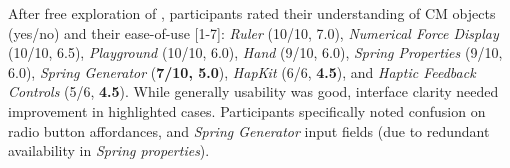 After free exploration of \SpringSim, participants rated their understanding of CM objects (yes/no) and their ease-of-use [1-7]:
\emph{Ruler} (10/10, 7.0),
\emph{Numerical Force Display} (10/10, 6.5),
\emph{Playground} (10/10, 6.0), 
\emph{Hand} (9/10, 6.0),
\emph{Spring Properties} (9/10, 6.0), 
\emph{Spring Generator} (\textbf{\textbf{7/10}, 5.0}),  
\emph{HapKit} (6/6, \textbf{4.5}), and
\emph{Haptic Feedback Controls} (5/6, \textbf{4.5}). 
%
While generally usability was good, interface clarity needed improvement in highlighted cases. 
Participants specifically noted confusion on radio button affordances, %
and \emph{Spring Generator} input fields (due to redundant availability in \emph{Spring properties}).



